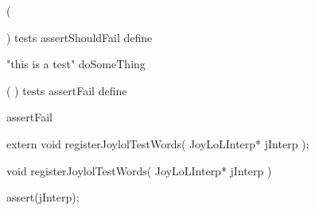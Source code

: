 \startTestSuite[assertShouldFail]

\startJoylolCode

(
  
)
tests
assertShouldFail
define
\stopJoylolCode

\startJoylolTest
"this is a test"
doSomeThing
\stopJoylolTest
\stopTestCase
\stopTestSuite

\startTestSuite[assertFail]

\startJoylolCode
(
)
tests
assertFail
define
\stopJoylolCode

\startJoylolTest
assertFail
\stopJoylolTest
\stopTestCase
\stopTestSuite

\startTestSuite[assertSucceed]

\stopTestSuite

\startTestSuite[assertTrue]

\stopTestSuite

\startTestSuite[assertFalse]

\stopTestSuite

\startTestSuite[assertNil]

\stopTestSuite

\startTestSuite[assertNotNil]

\stopTestSuite

\startTestSuite[assertAtom]

\stopTestSuite

\startTestSuite[assertPair]

\stopTestSuite

\startTestSuite[assertNatural]

\stopTestSuite

\startTestSuite[assertSymbol]

\stopTestSuite

\startTestSuite[assertContext]

\stopTestSuite

\startTestSuite[assertDictionary]

\stopTestSuite

\startTestSuite[assertDictNode]

\stopTestSuite


\startCHeader
extern void registerJoylolTestWords(
  JoyLoLInterp* jInterp
);
\stopCHeader
{}

\startCCode
void registerJoylolTestWords(
  JoyLoLInterp* jInterp
) {
  assert(jInterp);

}
\stopCCode
